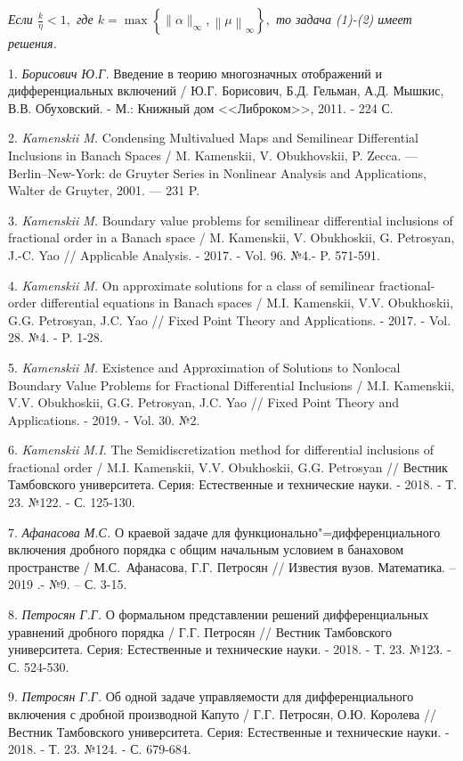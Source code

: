 {\it Если $\frac{k}{\eta} < 1,$ где $k=\max\left\{\|\alpha\|_\infty, \left\|\mu\right\|_{\infty}\right\},$ то задача (1)-(2) имеет решения.}


\litlist

1. {\it Борисович Ю.Г.} Введение в теорию многозначных ото\-бражений и дифференциальных включений / Ю.Г. Борисович, Б.Д. Гельман, А.Д. Мышкис, В.В. Обуховский. - М.: Книжный дом <<Либроком>>, 2011. - 224 С.


2. {\it Kamenskii M.} Condensing Multivalued Maps and Semilinear Differential Inclusions in Banach Spaces / M. Kamenskii, V. Obukhovskii, P. Zecca. --- Berlin--New-York: de Gruyter Series in Nonlinear Analysis and Applications, Walter de Gruyter, 2001. --- 231 P.

3. {\it Kamenskii M.}  Boundary value problems for semilinear differential inclusions of fractional order in a Banach space / M.  Kamenskii, V. Obukhoskii, G. Petrosyan, J.-C. Yao //  Applicable Analysis. - 2017. - Vol. 96. №4.- P. 571-591.

4. {\it Kamenskii M.}  On approximate solutions for a class of semilinear fractional-order differential equations in Banach spa\-ces / M.I. Kamenskii, V.V. Obukhoskii, G.G. Petrosyan, J.C. Yao // Fixed Point Theory and Applications. - 2017. - Vol. 28. №4. -  P. 1-28.

5. {\it Kamenskii M.}  Existence and Approximation of Solutions to Nonlocal Boundary Value Problems for  Fractional Differential Inclusions / M.I. Kamenskii, V.V. Obukhoskii, G.G. Petrosyan, J.C. Yao // Fixed Point Theory and Applications. - 2019. - Vol. 30. №2.

6. {\it Kamenskii M.I.} The Semidiscretization method for differential inclusions of fractional order / M.I. Kamenskii, V.V. Obukhoskii, G.G. Petrosyan //  Вестник Тамбовского университета. Серия: Естественные и технические науки. - 2018. - Т. 23. №122. -  С. 125-130.

7. {\it Афанасова М.С.} О краевой задаче для функционально"=дифференциального включения дробного порядка с общим начальным условием  в банаховом пространстве / \linebreak М.С.~Афанасова, Г.Г. Петросян // Известия вузов. Математика. – 2019 .- №9. – С. 3-15.

8. {\it Петросян Г.Г.} О формальном представлении решений дифференциальных уравнений дробного порядка / Г.Г. Петросян // Вестник Тамбовского университета. Серия: Естественные и технические науки. -  2018. - Т. 23. №123. - С. 524-530.

9. {\it Петросян Г.Г.} Об одной задаче управляемости для дифференциального включения с дробной производной Капуто  / Г.Г. Петросян, О.Ю. Королева // Вестник Тамбовского университета. Серия: Естественные и технические науки. - 2018. - Т. 23. №124. - С. 679-684.











